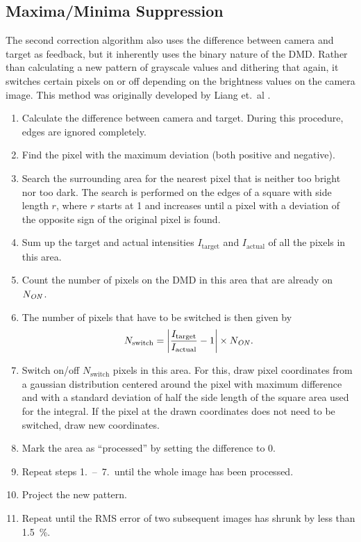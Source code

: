 \subsection{Maxima/Minima Suppression}
The second correction algorithm also uses the difference between camera and target as feedback, but it inherently uses the binary nature of the DMD. Rather than calculating a new pattern of grayscale values and dithering that again, it switches certain pixels on or off depending on the brightness values on the camera image. This method was originally developed by Liang et.\ al \cite{liang:2010}.
\begin{enumerate}
    \item Calculate the difference between camera and target. During this procedure, edges are ignored completely.
    \item Find the pixel with the maximum deviation (both positive and negative).
    \item Search the surrounding area for the nearest pixel that is neither too bright nor too dark. The search is performed on the edges of a square with side length $r$, where $r$ starts at 1 and increases until a pixel with a deviation of the opposite sign of the original pixel is found.
    \item Sum up the target and actual intensities $I_\text{target}$ and $I_\text{actual}$ of all the pixels in this area.
    \item Count the number of pixels on the DMD in this area that are already on $N_\text{\textit{ON}}$.
    \item The number of pixels that have to be switched is then given by \[N_\text{switch} = \left| \frac{I_\text{target}}{I_\text{actual}} - 1 \right|\times N_\text{\textit{ON}}. \]
    \item Switch on/off $N_\text{switch}$ pixels in this area. For this, draw pixel coordinates from a gaussian distribution centered around the pixel with maximum difference and with a standard deviation of half the side length of the square area used for the integral. If the pixel at the drawn coordinates does not need to be switched, draw new coordinates.
    \item Mark the area as \enquote{processed} by setting the difference to 0.
    \item Repeat steps 1.~--~7.\ until the whole image has been processed.
    \item Project the new pattern.
    \item Repeat until the RMS error of two subsequent images has shrunk by less than \SI{1.5}{\percent}.
\end{enumerate}
